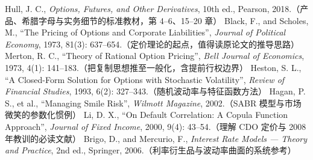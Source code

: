 \begin{furtherreading}
 Hull, J. C., \emph{Options, Futures, and Other Derivatives}, 10th ed., Pearson, 2018.（产品、希腊字母与实务细节的标准教材，第 4--6、15--20 章）
 Black, F., and Scholes, M., ``The Pricing of Options and Corporate Liabilities'', \emph{Journal of Political Economy}, 1973, 81(3): 637--654.（定价理论的起点，值得读原论文的推导思路）
 Merton, R. C., ``Theory of Rational Option Pricing'', \emph{Bell Journal of Economics}, 1973, 4(1): 141--183.（把复制思想推至一般化，含提前行权边界）
 Heston, S. L., ``A Closed-Form Solution for Options with Stochastic Volatility'', \emph{Review of Financial Studies}, 1993, 6(2): 327--343.（随机波动率与特征函数方法）
 Hagan, P. S., et al., ``Managing Smile Risk'', \emph{Wilmott Magazine}, 2002.（SABR 模型与市场微笑的参数化惯例）
 Li, D. X., ``On Default Correlation: A Copula Function Approach'', \emph{Journal of Fixed Income}, 2000, 9(4): 43--54.（理解 CDO 定价与 2008 年教训的必读文献）
 Brigo, D., and Mercurio, F., \emph{Interest Rate Models --- Theory and Practice}, 2nd ed., Springer, 2006.（利率衍生品与波动率曲面的系统参考）
\end{furtherreading}
